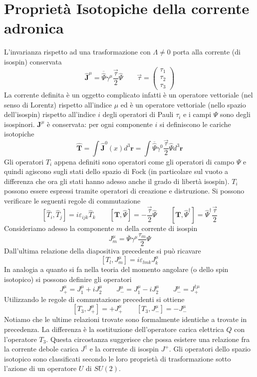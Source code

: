 \section{Proprietà Isotopiche della corrente adronica}
L'invarianza rispetto ad una trasformazione con $\Lambda\not=0$ porta alla corrente (di isospin) conservata
$$
\widehat{\mathbf{J}}^\mu = \overline{\widehat{\Psi}} \gamma^\mu \frac{\vec{\tau}}{2} \widehat{\Psi} \quad \quad \vec{\tau} = \begin{pmatrix} \tau_1 \\ \tau_2 \\ \tau_3 \end{pmatrix}
$$
La corrente definita è un oggetto complicato infatti è un operatore vettoriale (nel senso di Lorentz) rispetto all'indice $\mu$ ed è un operatore vettoriale (nello spazio dell'isospin) rispetto all'indice $i$ degli operatori di Pauli $\tau_i$ e i campi $\Psi$ sono degli isospinori. $\mathbf{J}^\mu$ è conservata: per ogni componente $i$ si definiscono le cariche isotopiche
$$
\widehat{\mathbf{T}} = \int \widehat{\mathbf{J}}^0 (x) d^3\mathbf{r} = \int \overline{\widehat{\Psi}} \gamma^0 \frac{\vec{\tau}}{2} \widehat{\Psi} d^3\mathbf{r}
$$
Gli operatori $T_i$ appena definiti sono operatori come gli operatori di campo $\Psi$ e quindi agiscono sugli stati dello spazio di Fock (in particolare sul vuoto a differenza che ora gli stati hanno adesso anche il grado di libertà isospin). $T_i$ possono essere espressi tramite operatori di creazione e distruzione. Si possono verificare le seguenti regole di commutazione
$$
[\widehat{T}_i, \widehat{T}_j] = i \varepsilon_{ijk} \widehat{T}_k \qquad [\mathbf{T}, \widehat{\Psi}] = - \frac{\vec{\tau}}{2} \widehat{\Psi} \quad \quad [\mathbf{T}, \widehat{\Psi}^\dagger] = \widehat{\Psi}^\dagger \frac{\vec{\tau}}{2}
$$
Consideriamo adesso la componente $m$ della corrente di isospin
$$
J^\mu_m = \overline{\Psi} \gamma^\mu \frac{\tau_m}{2} \Psi
$$
Dall'ultima relazione della diapositiva precedente si può ricavare
$$
[T_l, J_m^\mu] = i \varepsilon_{lmk} J_k^\mu
$$
In analogia a quanto si fa nella teoria del momento angolare (o dello spin isotopico) si possono definire gli operatori
$$
J_+^\mu = J_1^\mu + i J_2^\mu \quad \quad J_-^\mu = J_1^\mu - i J_2^\mu \quad \quad J_-^\mu = J_+^{\dagger \mu}
$$
Utilizzando le regole di commutazione precedenti si ottiene
$$
[T_3, J_+^\mu] = + J_+^\mu \quad \quad [T_3, J_-^\mu] = - J_-^\mu
$$
Notiamo che le ultime relazioni trovate sono formalmente identiche a trovate in precedenza. La differenza è la sostituzione dell'operatore carica elettrica $Q$ con l'operatore $T_3$. Questa circostanza suggerisce che possa esistere una relazione fra la corrente debole carica $J^\dagger$ e la corrente di isospin $J^+$. Gli operatori dello spazio isotopico sono classificati secondo le loro proprietà di trasformazione sotto l'azione di un operatore $U$ di $SU(2)$.
